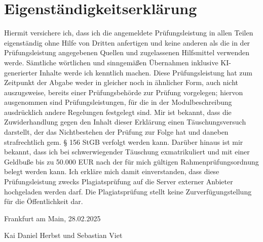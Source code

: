 \documentclass[12pt]{article}
\begin{document}
\begin{sloppypar}
    \listoftables
    \newpage

	\renewcommand{\contentsname}{Inhaltsverzeichnis}
	\tableofcontents


	\newpage
	\setcounter{page}{1}


	
	
	
	
	
	

	\printbibliography

    \newpage
    \section*{Eigenständigkeitserklärung}

    Hiermit versichere ich, dass ich die angemeldete Prüfungsleistung in allen
    Teilen eigenständig ohne Hilfe von Dritten anfertigen und keine anderen als
    die in der Prüfungsleistung angegebenen Quellen und zugelassenen Hilfsmittel
    verwenden werde. Sämtliche wörtlichen und sinngemäßen Übernahmen inklusive
    KI-generierter Inhalte werde ich kenntlich machen. Diese Prüfungsleistung
    hat zum Zeitpunkt der Abgabe weder in gleicher noch in ähnlicher Form, auch
    nicht auszugsweise, bereits einer Prüfungsbehörde zur Prüfung vorgelegen;
    hiervon ausgenommen sind Prüfungsleistungen, für die in der
    Modulbeschreibung ausdrücklich andere Regelungen festgelegt sind. Mir ist
    bekannt, dass die Zuwiderhandlung gegen den Inhalt dieser Erklärung einen
    Täuschungsversuch darstellt, der das Nichtbestehen der Prüfung zur Folge hat
    und daneben strafrechtlich gem. § 156 StGB verfolgt werden kann. Darüber
    hinaus ist mir bekannt, dass ich bei schwerwiegender Täuschung
    exmatrikuliert und mit einer Geldbuße bis zu 50.000 EUR nach der für mich
    gültigen Rahmenprüfungsordnung belegt werden kann. Ich erkläre mich damit
    einverstanden, dass diese Prüfungsleistung zwecks Plagiatsprüfung auf die
    Server externer Anbieter hochgeladen werden darf. Die Plagiatsprüfung stellt
    keine Zurverfügungstellung für die Öffentlichkeit dar.

    Frankfurt am Main, 28.02.2025

    Kai Daniel Herbst und Sebastian Viet

\end{sloppypar}
\end{document}
